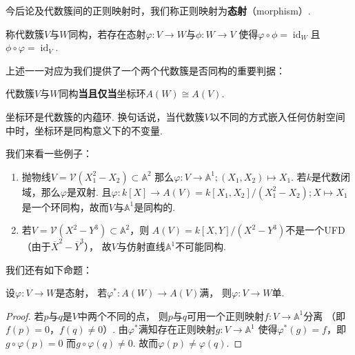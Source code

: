     \begin{remark}
        今后论及代数簇间的正则映射时，我们称正则映射为\textbf{态射}（morphism）.
    \end{remark}

    \begin{definition}[代数簇的同构]
        称代数簇$V$与$W$同构，若存在态射$\varphi\colon V \rightarrow W$与$\phi\colon W \rightarrow V$
        使得$\varphi \circ \phi = \operatorname{id}_{W}$且
        $\phi \circ \varphi = \operatorname{id}_{V}$.
    \end{definition}

    上述一一对应为我们提供了一个两个代数簇是否同构的重要判据：

    \begin{corollary}
        代数簇$V$与$W$同构\textbf{当且仅当}坐标环$A(W) \cong A(V)$.
    \end{corollary}

    \begin{remark}
        坐标环是代数簇的内蕴环. 
        换句话说，当代数簇$V$以不同的方式嵌入任何仿射空间中时，坐标环是同构意义下的不变量.
    \end{remark}

    我们来看一些例子：
    \begin{example}
        \begin{enumerate}
            \item 抛物线$V=\mathcal{V}(X_{1}^{2}-X_{2}) \subset \mathbb{A}^{2}$
                  那么$\varphi\colon V \rightarrow \mathbb{A}^{1};(X_{1},X_{2}) \mapsto X_{1}$.
                  若$k$是代数闭域，那么$\varphi$是双射. 
                  且$\varphi\colon k[X] \to A(V)=k[X_{1},X_{2}]/(X_{1}^{2}-X_{2});X \mapsto X_{1}$
                  是一个环同构，故而$V$与$\mathbb{A}^{1}$是同构的.
            \item 若$V=\mathcal{V}(X^{2}-Y^{3}) \subset \mathbb{A}^{2}$，则
                  $A(V)=k[X,Y]/(X^{2}-Y^{3})$不是一个UFD
                  （由于$\overline{X}^{2} - \overline{Y}^{3}$），
                  故$V$与仿射直线$\mathbb{A}^{1}$不可能同构.
        \end{enumerate}
    \end{example}

    我们还有如下命题：

    \begin{proposition}
        设$\varphi\colon V \rightarrow W$是态射，
        若$\varphi^{*}\colon A(W) \rightarrow A(V)$满，
        则$\varphi\colon V \rightarrow W$单.
    \end{proposition}
    \begin{proof}
        若$p$与$q$是$V$中两个不同的点，
        则$p$与$q$可用一个正则映射$f\colon V \rightarrow \mathbb{A}^{1}$分离
        （即$f(p)=0$，$f(q)\neq 0$）. 由$\varphi^{*}$满知存在正则映射$g\colon V \rightarrow \mathbb{A}^{1}$
        使得$\varphi^{*}(g)=f$，即$g \circ \varphi(p) = 0$
        而$g \circ \varphi(q) \neq 0$. 故而$\varphi(p) \neq \varphi(q)$.
    \end{proof}

